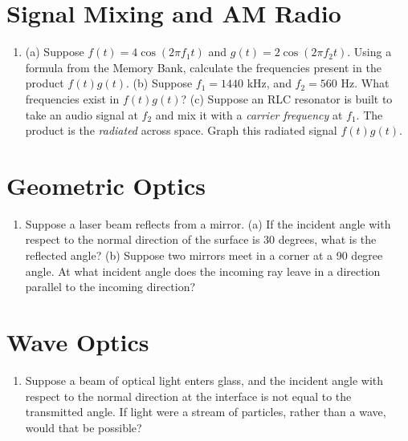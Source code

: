 \documentclass{article}
\begin{document}
\section{Signal Mixing and AM Radio}

\begin{enumerate}
\item (a) Suppose $f(t) = 4\cos(2\pi f_1 t)$ and $g(t) = 2\cos(2\pi f_2 t)$.  Using a formula from the Memory Bank, calculate the frequencies present in the product $f(t) g(t)$. (b) Suppose $f_1 = 1440$ kHz, and $f_2 = 560$ Hz.  What frequencies exist in $f(t) g(t)$? (c) Suppose an RLC resonator is built to take an audio signal at $f_2$ and mix it with a \textit{carrier frequency} at $f_1$.  The product is the \textit{radiated} across space.  Graph this radiated signal $f(t) g(t)$. \\ \vspace{3cm}
\end{enumerate}

\section{Geometric Optics}

\begin{enumerate}
\item Suppose a laser beam reflects from a mirror. (a) If the incident angle with respect to the normal direction of the surface is 30 degrees, what is the reflected angle? (b) Suppose two mirrors meet in a corner at a 90 degree angle.  At what incident angle does the incoming ray leave in a direction parallel to the incoming direction? \\ \vspace{4cm}
\end{enumerate}

\section{Wave Optics}

\begin{enumerate}
\item Suppose a beam of optical light enters glass, and the incident angle with respect to the normal direction at the interface is not equal to the transmitted angle.  If light were a stream of particles, rather than a wave, would that be possible?
\end{enumerate}
\end{document}
